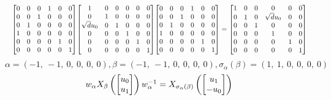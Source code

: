 \documentclass[11pt]{article}
\theoremstyle{definition}
\begin{document}
\[
\scaletoalign{\textwidth}{{\left[\begin{matrix}0 & 0 & 0 & 1 & 0 & 0\\0 & 0 & 1 & 0 & 0 & 0\\0 & 1 & 0 & 0 & 0 & 0\\1 & 0 & 0 & 0 & 0 & 0\\0 & 0 & 0 & 0 & 1 & 0\\0 & 0 & 0 & 0 & 0 & 1\end{matrix}\right]} {\left[\begin{matrix}1 & 0 & 0 & 0 & 0 & 0\\0 & 1 & 0 & 0 & 0 & 0\\\sqrt{d} u_{0} & 0 & 1 & 0 & 0 & 0\\0 & 0 & 0 & 1 & 0 & 0\\0 & 0 & 0 & 0 & 1 & 0\\0 & 0 & 0 & 0 & 0 & 1\end{matrix}\right]} {\left[\begin{matrix}0 & 0 & 0 & 1 & 0 & 0\\0 & 0 & 1 & 0 & 0 & 0\\0 & 1 & 0 & 0 & 0 & 0\\1 & 0 & 0 & 0 & 0 & 0\\0 & 0 & 0 & 0 & 1 & 0\\0 & 0 & 0 & 0 & 0 & 1\end{matrix}\right]} = {\left[\begin{matrix}1 & 0 & 0 & 0 & 0 & 0\\0 & 1 & 0 & \sqrt{d} u_{0} & 0 & 0\\0 & 0 & 1 & 0 & 0 & 0\\0 & 0 & 0 & 1 & 0 & 0\\0 & 0 & 0 & 0 & 1 & 0\\0 & 0 & 0 & 0 & 0 & 1\end{matrix}\right]}}
\]
\[
\alpha = \left( -1, \  -1, \  0, \  0, \  0, \  0\right), \beta = \left( -1, \  -1, \  0, \  0, \  0, \  0\right), \sigma_{\alpha}(\beta) = \left( 1, \  1, \  0, \  0, \  0, \  0\right)
\]
\[
\scaletoalign{\textwidth}{w_{\alpha} X_{\beta}\left(\left[\begin{matrix}u_{0}\\u_{1}\end{matrix}\right]\right) w_{\alpha}^{-1} = X_{\sigma_{\alpha}\left(\beta\right)}\left(\left[\begin{matrix}u_{1}\\- u_{0}\end{matrix}\right]\right)}
\]
\end{document}
